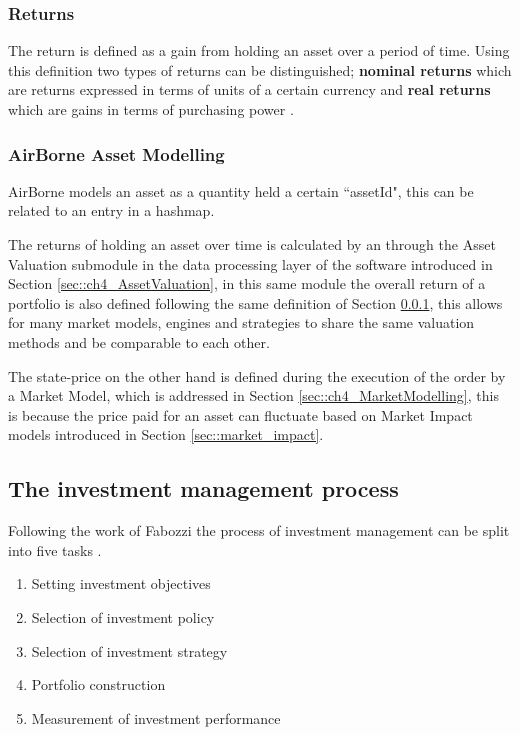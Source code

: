 \subsubsection{Returns}   \label{sec::ch2_returnDef}
The return is defined as a gain from holding an asset over a period of time. Using this definition two types of returns can be distinguished; \textbf{nominal returns} which are returns expressed in terms of units of a certain currency and \textbf{real returns} which are gains in terms of purchasing power \cite{assetPricing}.

\subsubsection{AirBorne Asset Modelling}
AirBorne models an asset as a quantity held a certain ``assetId", this can be related to an entry in a hashmap. 

The returns of holding an asset over time is calculated by an through the Asset Valuation submodule in the data processing layer of the software introduced in Section \ref{sec::ch4_AssetValuation}, in this same module the overall return of a portfolio is also defined following the same definition of Section \ref{sec::ch2_returnDef}, this allows for many market models, engines and strategies to share the same valuation methods and be comparable to each other.

The state-price on the other hand is defined during the execution of the order by a Market Model, which is addressed in Section \ref{sec::ch4_MarketModelling}, this is because the price paid for an asset can fluctuate based on Market Impact models introduced in Section \ref{sec::market_impact}.


\subsection{The investment management process}
Following the work of Fabozzi the process of investment management can be split into five tasks \cite{investment_management_book_2010}. 
\begin{enumerate}
    \item Setting investment objectives %
    \item Selection of investment policy %
    \item Selection of investment strategy %
    \item Portfolio construction %
    \item Measurement of investment performance %
\end{enumerate}

